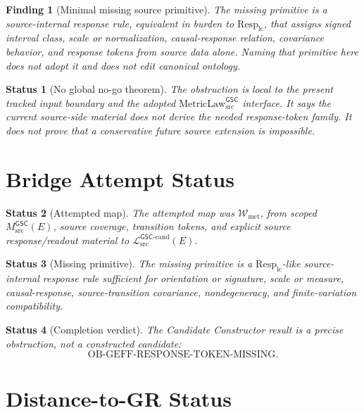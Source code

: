 \documentclass[11pt]{article}
\newcommand{\MsrcGSC}{M_{\mathrm{src}}^{\mathsf{GSC}}}
\newcommand{\MetricLaw}{\mathrm{MetricLaw}_{\mathrm{src}}^{\mathsf{GSC}}}
\newcommand{\MetricDataCand}{\mathcal{L}_{\mathrm{src}}^{\mathsf{GSC}\mbox{-}\mathrm{cand}}}
\newcommand{\RespLC}{\mathrm{Resp}_{\mathrm{lc}}}
\newtheorem{finding}{Finding}
\newtheorem{status}{Status}
\begin{document}
\begin{finding}[Minimal missing source primitive]
The missing primitive is a source-internal response rule, equivalent in burden
to \(\RespLC\), that assigns signed interval class, scale or normalization,
causal-response relation, covariance behavior, and response tokens from
source data alone. Naming that primitive here does not adopt it and does not
edit canonical ontology.
\end{finding}

\begin{status}[No global no-go theorem]
The obstruction is local to the present tracked input boundary and the adopted
\(\MetricLaw\) interface. It says the current source-side material does not
derive the needed response-token family. It does not prove that a conservative
future source extension is impossible.
\end{status}

\section{Bridge Attempt Status}

\begin{status}[Attempted map]
The attempted map was \(\mathcal{W}_{\mathrm{met}}\), from scoped
\(\MsrcGSC(E)\), source coverage, transition tokens, and explicit source
response/readout material to \(\MetricDataCand(E)\).
\end{status}

\begin{status}[Missing primitive]
The missing primitive is a \(\RespLC\)-like source-internal response rule
sufficient for orientation or signature, scale or measure, causal-response,
source-transition covariance, nondegeneracy, and finite-variation
compatibility.
\end{status}

\begin{status}[Completion verdict]
The Candidate Constructor result is a precise obstruction, not a constructed
candidate:
\[
  \mathrm{OB\mbox{-}GEFF\mbox{-}RESPONSE\mbox{-}TOKEN\mbox{-}MISSING}.
\]
\end{status}

\section{Distance-to-GR Status}
\end{document}

